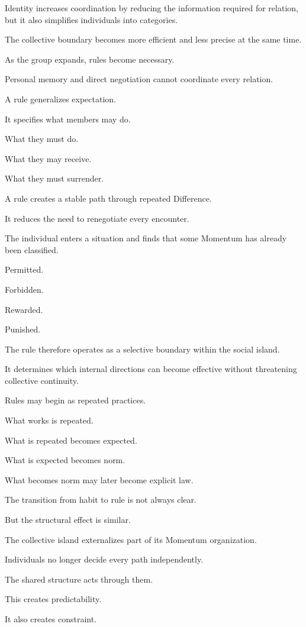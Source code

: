 Identity increases coordination by reducing the information required for relation, but it also simplifies individuals into categories.

The collective boundary becomes more efficient and less precise at the same time.

As the group expands, rules become necessary.

Personal memory and direct negotiation cannot coordinate every relation.

A rule generalizes expectation.

It specifies what members may do.

What they must do.

What they may receive.

What they must surrender.

A rule creates a stable path through repeated Difference.

It reduces the need to renegotiate every encounter.

The individual enters a situation and finds that some Momentum has already been classified.

Permitted.

Forbidden.

Rewarded.

Punished.

The rule therefore operates as a selective boundary within the social island.

It determines which internal directions can become effective without threatening collective continuity.

Rules may begin as repeated practices.

What works is repeated.

What is repeated becomes expected.

What is expected becomes norm.

What becomes norm may later become explicit law.

The transition from habit to rule is not always clear.

But the structural effect is similar.

The collective island externalizes part of its Momentum organization.

Individuals no longer decide every path independently.

The shared structure acts through them.

This creates predictability.

It also creates constraint.

